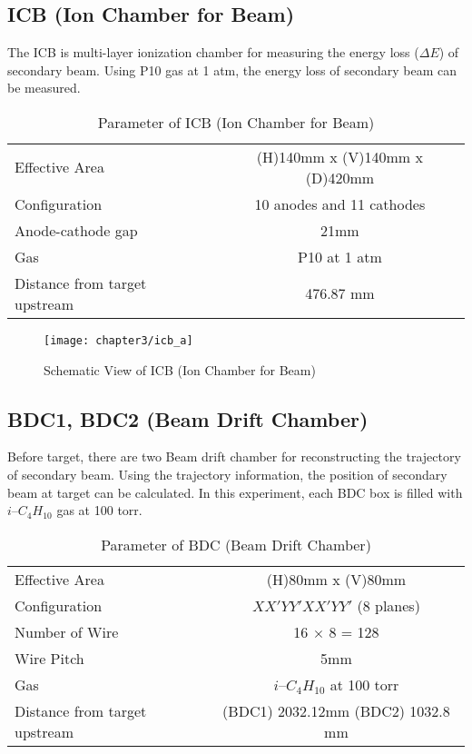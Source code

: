 \clearpage

\subsection{ICB (Ion Chamber for Beam)}
The ICB is multi-layer ionization chamber for measuring the energy loss ($\Delta E$) of secondary beam. Using P10 gas at 1 atm, the energy loss of secondary beam can be measured. 
\begin{table}[h]
    \centering
    \begin{tabular}{l|c}
        \hline
        Effective Area & (H)140mm x (V)140mm x (D)420mm\\
        Configuration & 10 anodes and 11 cathodes \\
        Anode-cathode gap & 21mm \\
        Gas & P10 at 1 atm\\
        Distance from target upstream & 476.87 mm \\
        \hline
    \end{tabular}
    \caption{Parameter of ICB (Ion Chamber for Beam) \cite{SAMURAI}}
\end{table}

\begin{figure}[t]
    \centering
    \texttt{[image: chapter3/icb\_a]}
    \caption{Schematic View of ICB (Ion Chamber for Beam) \cite{SAMURAI}}
\end{figure}

\subsection{BDC1, BDC2 (Beam Drift Chamber)}
Before target, there are two Beam drift chamber for reconstructing the trajectory of secondary beam. Using the trajectory information, the position of secondary beam at target can be calculated. In this experiment, each BDC box is filled with $i$--${C}_{4} {H}_{10}$ gas at 100 torr. 

\begin{table}[h]
    \centering
    \begin{tabular}[h]{l|c}
        \hline
        Effective Area & (H)80mm x (V)80mm\\
        Configuration & $XX'YY'XX'YY'$ (8 planes)\\
        Number of Wire & 16 $\times$ 8 = 128 \\
        Wire Pitch & 5mm \\
        Gas & $i$--${C}_{4} {H}_{10}$ at 100 torr\\
        Distance from target upstream & (BDC1) 2032.12mm (BDC2) 1032.8 mm \\
        \hline
    \end{tabular}
    \caption{Parameter of BDC (Beam Drift Chamber) \cite{SAMURAI}}
\end{table}

